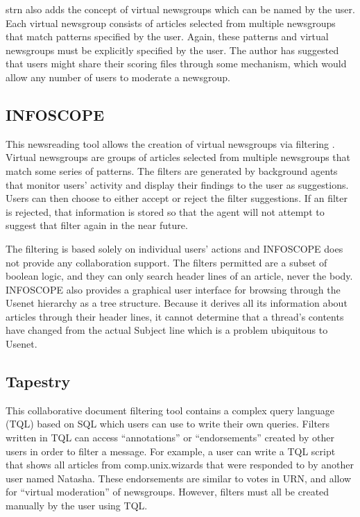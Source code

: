 strn also adds the concept of virtual newsgroups which can be named by the
user. Each virtual newsgroup consists of articles selected from multiple
newsgroups that match patterns specified by the user. Again, these patterns and
virtual newsgroups must be explicitly specified by the user. The author has
suggested that users might share their scoring files through some mechanism,
which would allow any number of users to moderate a newsgroup.

\subsection{INFOSCOPE}

This newsreading tool allows the creation of virtual newsgroups via filtering
\cite{chi-infoscope-91,cacm-infoscope-92}. Virtual newsgroups are groups of
articles selected from multiple newsgroups that match some series of patterns.
The filters are generated by background agents that monitor users' activity and
display their findings to the user as suggestions. Users can then choose to
either accept or reject the filter suggestions. If an filter is rejected, that
information is stored so that the agent will not attempt to suggest that filter
again in the near future.

The filtering is based solely on individual users' actions and INFOSCOPE does
not provide any collaboration support.  The filters permitted are a subset of
boolean logic, and they can only search header lines of an article, never the
body. INFOSCOPE also provides a graphical user interface for browsing through
the Usenet hierarchy as a tree structure. Because it derives all its
information about articles through their header lines, it cannot determine that
a thread's contents have changed from the actual Subject line which is a
problem ubiquitous to Usenet.

\subsection{Tapestry}

This collaborative document filtering tool \cite{cacm-tapestry-92} contains a
complex query language (TQL) based on SQL which users can use to write their
own queries.  Filters written in TQL can access ``annotations'' or
``endorsements'' created by other users in order to filter a message. For
example, a user can write a TQL script that shows all articles from
comp.unix.wizards that were responded to by another user named Natasha. These
endorsements are similar to votes in URN, and allow for ``virtual moderation''
of newsgroups.  However, filters must all be created manually by the user using
TQL.

